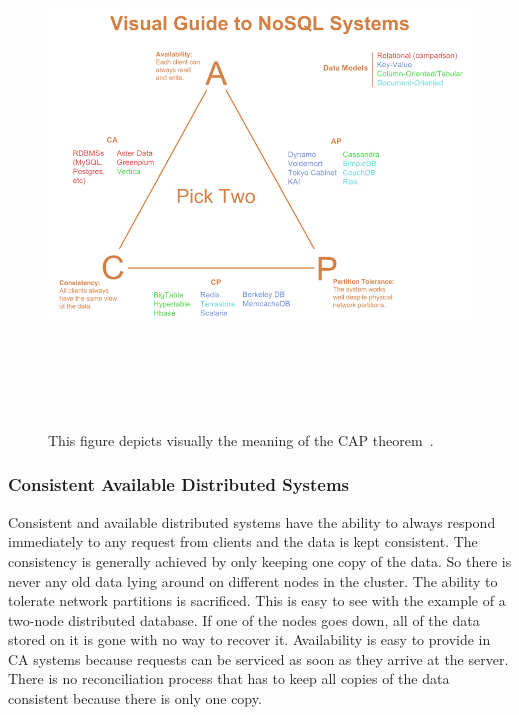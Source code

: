 \documentclass[12pt]{ucthesis}
\newcommand{\captionfonts}{\small\bf\ssp}
\begin{document}
\begin{figure}[H]
\begin{center}
\includegraphics[height=130mm]{cap_theorem.png}
\captionfonts
\caption[Visual guide to the CAP theorem]{This figure depicts visually the meaning of the CAP theorem~\cite{guide_nosql}.}
\label{fig:guide_nosql}
\end{center}
\end{figure}

\subsubsection{Consistent Available Distributed Systems}

Consistent and available distributed systems have the ability to always respond immediately to any request
from clients and the data is kept consistent. The consistency is generally achieved by only keeping one copy
of the data. So there is never any old data lying around on different nodes in the cluster. The ability to 
tolerate network partitions is sacrificed. This is easy to see with the example of a two-node distributed 
database. If one of the nodes goes down, all of the data stored on it is gone with no way to recover it. Availability is easy to provide in CA systems because requests can be serviced as soon as they arrive at the
server. There is no reconciliation process that has to keep all copies of the data consistent because there
is only one copy.
\end{document}
